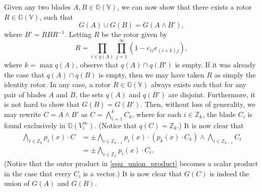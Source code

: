 \documentclass{birkjour}
\theoremstyle{definition}
\theoremstyle{remark}
\numberwithin{equation}{section}
\newcommand{\G}{\mathbb{G}}
\newcommand{\V}{\mathbb{V}}
\newcommand{\Z}{\mathbb{Z}}
\begin{document}
Given any two blades $A,B\in\G(\V)$, we can now show that
there exists a rotor $R\in\G(\V)$, such that
\begin{equation}
G(A)\cup G(B)=G(A\wedge B'),
\end{equation}
where $B'=RBR^{-1}$.  Letting $R$ be the rotor given by
\begin{equation}
R = \prod_{i\in q(A)}\prod_{j=1}^\infty(1-e_{ij}e_{(i+k)j}),
\end{equation}
where $k=\max q(A)$, observe that $q(A)\cap q(B')$ is empty.
If it was already the case that $q(A)\cap q(B)$ is empty, then we may have taken
$R$ as simply the identity rotor.  In any case, a rotor $R\in\G(\V)$ always exists
such that for any pair of blades $A$ and $B$, the sets $q(A)$ and $q(B')$ are disjoint.
Furthermore, it is not hard to show that $G(B)=G(B')$.  Then, without loss of generality,
we may rewrite $C=A\wedge B'$ as $C=\bigwedge_{i=1}^k C_k$, where for
each $i\in\Z_k$, the blade $C_i$ is found exclusively in $\G(V_i^\infty)$.
(Notice that $q(C)=\Z_k$.)
It is now clear that
\begin{align}
\bigwedge_{i\in\Z_k} p_i(x)\cdot C &= \pm\bigwedge_{i\in\Z_{k-1}} p_i(x)\cdot
(p_k(x)\cdot C_k)\wedge\bigwedge_{i\in\Z_{k-1}} C_i \\
 &= \pm\bigwedge_{i\in\Z_k}p_i(x)\cdot C_i.\label{equ_union_product}
\end{align}
(Notice that the outer product in \eqref{equ_union_product} becomes
a scalar product in the case that every $C_i$ is a vector.)
It is now clear that $G(C)$ is indeed the union of $G(A)$ and $G(B)$.






\end{document}
